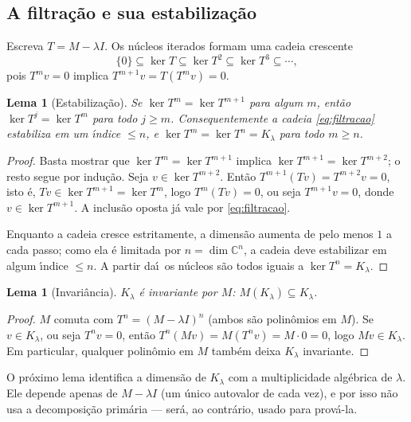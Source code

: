 \documentclass[11pt,a4paper]{amsart}
\newcommand{\C}{\mathbb{C}}
\theoremstyle{plain}
\newtheorem{lema}[teorema]{Lema}
\theoremstyle{definition}
\theoremstyle{remark}
\begin{document}
\subsection{A filtra\c{c}\~ao e sua estabiliza\c{c}\~ao}

Escreva $T=M-\lambda I$. Os n\'ucleos iterados formam uma cadeia crescente
\begin{equation}\label{eq:filtracao}
  \{0\}\subseteq \ker T \subseteq \ker T^2 \subseteq \ker T^3 \subseteq\cdots,
\end{equation}
pois $T^m v=0$ implica $T^{m+1}v=T(T^m v)=0$.

\begin{lema}[Estabiliza\c{c}\~ao]\label{lema:estab}
Se $\ker T^{m}=\ker T^{m+1}$ para algum $m$, ent\~ao $\ker T^{j}=\ker T^{m}$
para todo $j\ge m$. Consequentemente a cadeia \eqref{eq:filtracao} estabiliza
em um \'\i ndice $\le n$, e $\ker T^m = \ker T^n = K_\lambda$ para todo $m\ge n$.
\end{lema}

\begin{proof}
Basta mostrar que $\ker T^{m}=\ker T^{m+1}$ implica $\ker T^{m+1}=\ker T^{m+2}$;
o resto segue por indu\c{c}\~ao. Seja $v\in\ker T^{m+2}$. Ent\~ao
$T^{m+1}(Tv)=T^{m+2}v=0$, isto \'e, $Tv\in\ker T^{m+1}=\ker T^{m}$, logo
$T^{m}(Tv)=0$, ou seja $T^{m+1}v=0$, donde $v\in\ker T^{m+1}$. A inclus\~ao
oposta j\'a vale por \eqref{eq:filtracao}.

Enquanto a cadeia cresce estritamente, a dimens\~ao aumenta de pelo menos $1$ a
cada passo; como ela \'e limitada por $n=\dim\C^n$, a cadeia deve estabilizar
em algum \'\i ndice $\le n$. A partir da\'\i\ os n\'ucleos s\~ao todos iguais a
$\ker T^n = K_\lambda$.
\end{proof}

\begin{lema}[Invari\^ancia]\label{lema:invar}
$K_\lambda$ \'e invariante por $M$: $M(K_\lambda)\subseteq K_\lambda$.
\end{lema}

\begin{proof}
$M$ comuta com $T^n=(M-\lambda I)^n$ (ambos s\~ao polin\^omios em $M$). Se
$v\in K_\lambda$, ou seja $T^n v=0$, ent\~ao $T^n(Mv)=M(T^n v)=M\cdot 0=0$,
logo $Mv\in K_\lambda$. Em particular, qualquer polin\^omio em $M$ tamb\'em
deixa $K_\lambda$ invariante.
\end{proof}

O pr\'oximo lema identifica a dimens\~ao de $K_\lambda$ com a multiplicidade
alg\'ebrica de $\lambda$. Ele depende apenas de $M-\lambda I$ (um \'unico
autovalor de cada vez), e por isso n\~ao usa a decomposi\c{c}\~ao prim\'aria ---
ser\'a, ao contr\'ario, usado para prov\'a-la.
\end{document}
